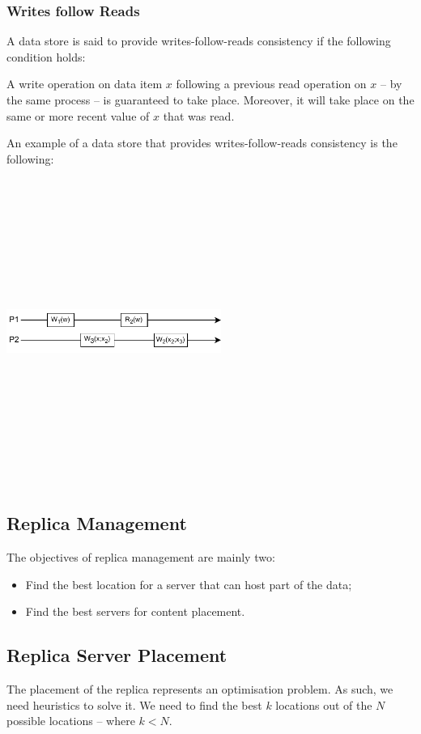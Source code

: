 \documentclass{article}
\begin{document}
\subsubsection{Writes follow Reads}
A data store is said to provide writes-follow-reads consistency if the following condition holds:
\begin{changemargin}{0.4cm}{0cm} 
A write operation on data item $x$ following a previous read operation on $x$ -- by the same process -- is guaranteed to take place. Moreover, it will take place on the same or more recent value of $x$ that was read.
\end{changemargin}
An example of a data store that provides writes-follow-reads consistency is the following:
\begin{center}
	\includegraphics[width=7cm, height=10cm, keepaspectratio]{assets/writes-follow-reads.pdf}
\end{center}

\subsection{Replica Management}
The objectives of replica management are mainly two:
\begin{itemize}
	\item Find the best location for a server that can host part of the data;
	\item Find the best servers for content placement.
\end{itemize}

\subsection{Replica Server Placement}
The placement of the replica represents an optimisation problem. As such, we need heuristics to solve it. We need to find the best $k$ locations out of the $N$ possible locations -- where $k < N$.
\end{document}
